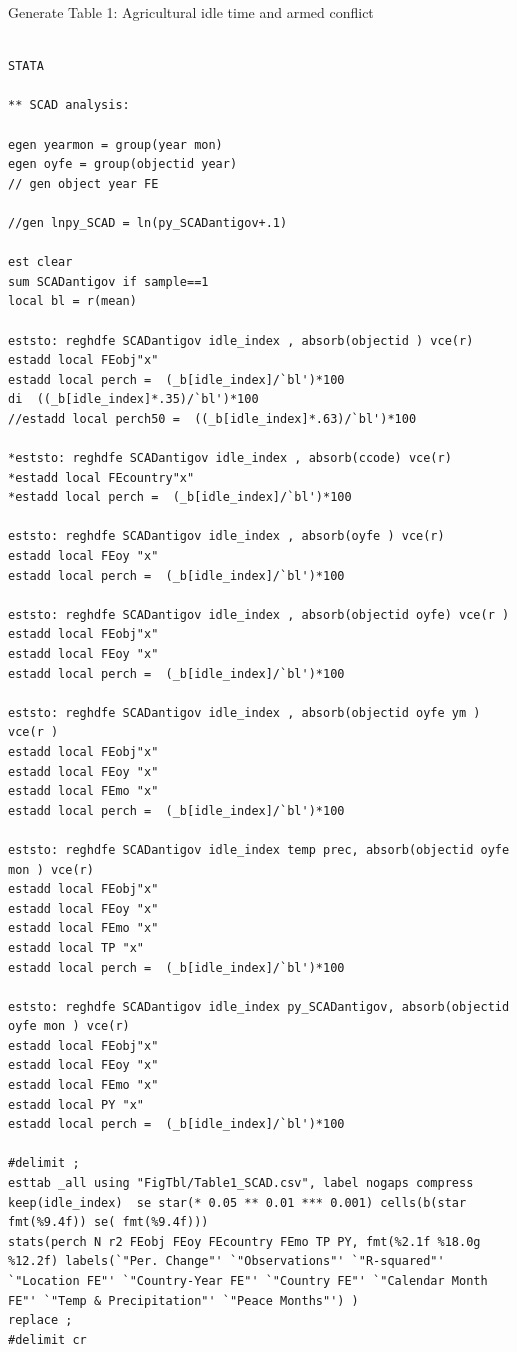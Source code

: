 \documentclass[12pt,letterpaper]{article}
\begin{document}
Generate Table 1: Agricultural idle time and armed conflict

\begin{lstlisting}

STATA	
			
** SCAD analysis:

egen yearmon = group(year mon) 
egen oyfe = group(objectid year)
// gen object year FE

//gen lnpy_SCAD = ln(py_SCADantigov+.1)

est clear 
sum SCADantigov if sample==1 
local bl = r(mean) 

eststo: reghdfe SCADantigov idle_index , absorb(objectid ) vce(r)  
estadd local FEobj"x"
estadd local perch =  (_b[idle_index]/`bl')*100
di  ((_b[idle_index]*.35)/`bl')*100
//estadd local perch50 =  ((_b[idle_index]*.63)/`bl')*100

*eststo: reghdfe SCADantigov idle_index , absorb(ccode) vce(r)  
*estadd local FEcountry"x"
*estadd local perch =  (_b[idle_index]/`bl')*100

eststo: reghdfe SCADantigov idle_index , absorb(oyfe ) vce(r)  
estadd local FEoy "x"
estadd local perch =  (_b[idle_index]/`bl')*100

eststo: reghdfe SCADantigov idle_index , absorb(objectid oyfe) vce(r )  
estadd local FEobj"x"
estadd local FEoy "x"
estadd local perch =  (_b[idle_index]/`bl')*100

eststo: reghdfe SCADantigov idle_index , absorb(objectid oyfe ym ) vce(r )  
estadd local FEobj"x"
estadd local FEoy "x"
estadd local FEmo "x"
estadd local perch =  (_b[idle_index]/`bl')*100

eststo: reghdfe SCADantigov idle_index temp prec, absorb(objectid oyfe mon ) vce(r)  
estadd local FEobj"x"
estadd local FEoy "x"
estadd local FEmo "x"
estadd local TP "x"
estadd local perch =  (_b[idle_index]/`bl')*100

eststo: reghdfe SCADantigov idle_index py_SCADantigov, absorb(objectid oyfe mon ) vce(r)  
estadd local FEobj"x"
estadd local FEoy "x"
estadd local FEmo "x"
estadd local PY "x"
estadd local perch =  (_b[idle_index]/`bl')*100

#delimit ; 
esttab _all using "FigTbl/Table1_SCAD.csv", label nogaps compress 
keep(idle_index)  se star(* 0.05 ** 0.01 *** 0.001) cells(b(star fmt(%9.4f)) se( fmt(%9.4f)))
stats(perch N r2 FEobj FEoy FEcountry FEmo TP PY, fmt(%2.1f %18.0g %12.2f) labels(`"Per. Change"' `"Observations"' `"R-squared"' `"Location FE"' `"Country-Year FE"' `"Country FE"' `"Calendar Month FE"' `"Temp & Precipitation"' `"Peace Months"') )
replace ; 
#delimit cr 



\end{lstlisting}
\end{document}
